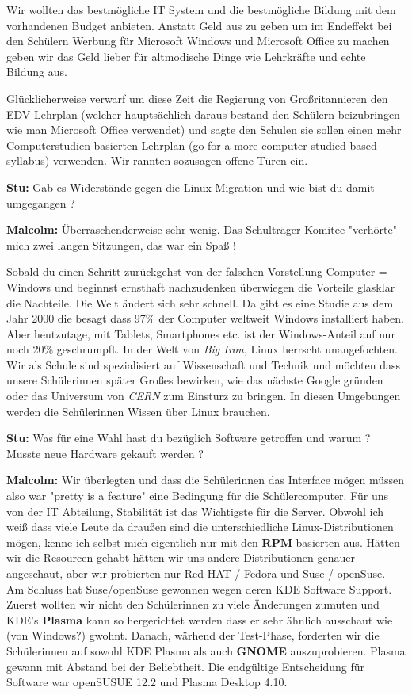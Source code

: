 Wir wollten das bestmögliche IT System und die bestmögliche Bildung mit dem vorhandenen Budget anbieten. Anstatt Geld aus zu geben um im Endeffekt bei den Schülern Werbung für Microsoft Windows und Microsoft Office zu machen geben wir das Geld lieber für altmodische Dinge wie Lehrkräfte und echte Bildung aus.

Glücklicherweise verwarf um diese Zeit die Regierung von Großritannieren den EDV-Lehrplan (welcher hauptsächlich daraus bestand den Schülern beizubringen wie man Microsoft Office verwendet) und sagte den Schulen sie sollen einen mehr Computerstudien-basierten Lehrplan (go for a more computer studied-based syllabus) verwenden. Wir rannten sozusagen offene Türen ein.

\textbf{Stu:} Gab es Widerstände gegen die Linux-Migration und wie bist du damit umgegangen ?

\textbf{Malcolm:} Überraschenderweise sehr wenig. Das Schulträger-Komitee "verhörte" mich zwei langen Sitzungen, das war ein Spaß ! 

Sobald du einen Schritt zurückgehst von der falschen Vorstellung Computer = Windows und beginnst ernsthaft nachzudenken überwiegen die Vorteile glasklar die Nachteile. Die Welt ändert sich sehr schnell. Da gibt es eine Studie aus dem Jahr 2000 die besagt dass 97\% der Computer weltweit Windows installiert haben. Aber heutzutage, mit Tablets, Smartphones etc. ist der Windows-Anteil auf nur noch 20\% geschrumpft. In der Welt von \textit{Big Iron}, Linux herrscht unangefochten. Wir als Schule  sind spezialisiert auf Wissenschaft und Technik und möchten dass unsere Schülerinnen später Großes bewirken, wie das nächste Google gründen oder das Universum von \textit{CERN} zum Einsturz zu bringen. In diesen Umgebungen werden die Schülerinnen Wissen über Linux brauchen.

\textbf{Stu:} Was für eine Wahl hast du bezüglich Software getroffen und warum ? Musste neue Hardware gekauft werden ?

\textbf{Malcolm:} Wir überlegten und dass die Schülerinnen das Interface mögen müssen also war "pretty is a feature" eine Bedingung für die Schülercomputer. Für uns von der IT Abteilung, Stabilität ist das Wichtigste für die Server. Obwohl ich weiß dass viele Leute da draußen sind die unterschiedliche Linux-Distributionen mögen, kenne ich selbst mich eigentlich nur mit den \textbf{RPM} basierten aus. Hätten wir die Resourcen gehabt hätten wir uns andere Distributionen genauer angeschaut, aber wir probierten nur Red HAT / Fedora und Suse / openSuse. Am Schluss hat Suse/openSuse gewonnen wegen deren KDE Software Support. Zuerst wollten wir nicht den Schülerinnen zu viele Änderungen zumuten und KDE's \textbf{Plasma} kann so hergerichtet werden dass er sehr ähnlich ausschaut wie (von Windows?) gwohnt. Danach, wärhend der Test-Phase, forderten wir die Schülerinnen auf sowohl KDE Plasma als auch \textbf{GNOME} auszuprobieren. Plasma gewann mit Abstand bei der Beliebtheit. Die endgültige Entscheidung für Software war openSUSUE 12.2 und Plasma Desktop 4.10.

